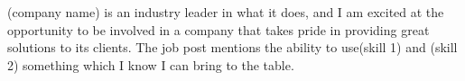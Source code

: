 (company name) is an industry leader in what it does, and I am excited at the opportunity to be involved in a company that takes pride in providing great solutions to its clients. The job post mentions the ability to use(skill 1) and (skill 2) something which I know I can bring to the table.